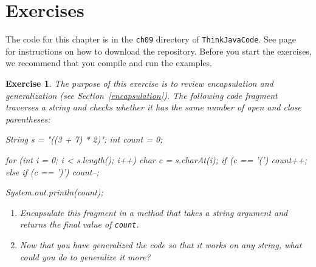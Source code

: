 \documentclass[12pt]{book}
\theoremstyle{exercise}
\newtheorem{exercise}{Exercise}[chapter]
\newcommand{\java}[1]{\verb"#1"}
\begin{document}
\section{Exercises}

The code for this chapter is in the {\tt ch09} directory of {\tt ThinkJavaCode}.
See page~\pageref{code} for instructions on how to download the repository.
Before you start the exercises, we recommend that you compile and run the examples.

\begin{exercise}


The purpose of this exercise is to review encapsulation and generalization (see Section~\ref{encapsulation}).
The following code fragment traverses a string and checks whether it has the same number of open and close parentheses:

\begin{code}
    String s = "((3 + 7) * 2)";
    int count = 0;

    for (int i = 0; i < s.length(); i++) {
        char c = s.charAt(i);
        if (c == '(') {
            count++;
        } else if (c == ')') {
            count--;
        }
    }

    System.out.println(count);
\end{code}

\begin{enumerate}

\item Encapsulate this fragment in a method that takes a string argument and returns the final value of \java{count}.

\item Now that you have generalized the code so that it works on any string, what could you do to generalize it more?

\end{enumerate}

\end{exercise}
\end{document}
